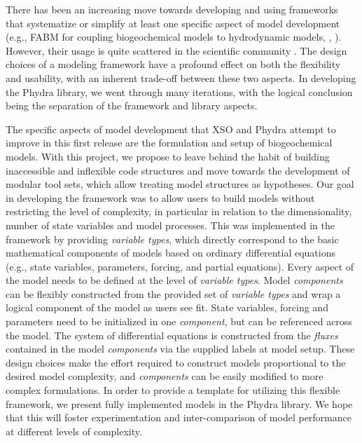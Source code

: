 \documentclass[gmd, manuscript]{copernicus}
\begin{document}
There has been an increasing move towards developing and using frameworks that systematize or simplify at least one specific aspect of model development (e.g., FABM for coupling biogeochemical models to hydrodynamic models, \citeauthor{Bruggeman2014a}, \citeyear{Bruggeman2014a}). However, their usage is quite scattered in the scientific community \citep{Janssen2015ExploringPerspective}. The design choices of a modeling framework have a profound effect on both the flexibility and usability, with an inherent trade-off between these two aspects. In developing the Phydra library, we went through many iterations, with the logical conclusion being the separation of the framework and library aspects.

The specific aspects of model development that XSO and Phydra attempt to improve in this first release are the formulation and setup of biogeochemical models. With this project, we propose to leave behind the habit of building inaccessible and inflexible code structures and move towards the development of modular tool sets, which allow treating model structures as hypotheses. Our goal in developing the framework was to allow users to build models without restricting the level of complexity, in particular in relation to the dimensionality, number of state variables and model processes. This was implemented in the framework by providing \textit{variable types}, which directly correspond to the basic mathematical components of models based on ordinary differential equations (e.g., state variables, parameters, forcing, and partial equations). Every aspect of the model needs to be defined at the level of \textit{variable types}. Model \textit{components} can be flexibly constructed from the provided set of \textit{variable types} and wrap a logical component of the model as users see fit. State variables, forcing and parameters need to be initialized in one \textit{component}, but can be referenced across the model. The system of differential equations is constructed from the \textit{fluxes} contained in the model \textit{components} via the supplied labels at model setup. These design choices make the effort required to construct models proportional to the desired model complexity, and \textit{components} can be easily modified to more complex formulations. In order to provide a template for utilizing this flexible framework, we present fully implemented models in the Phydra library. We hope that this will foster experimentation and inter-comparison of model performance at different levels of complexity.
\end{document}
